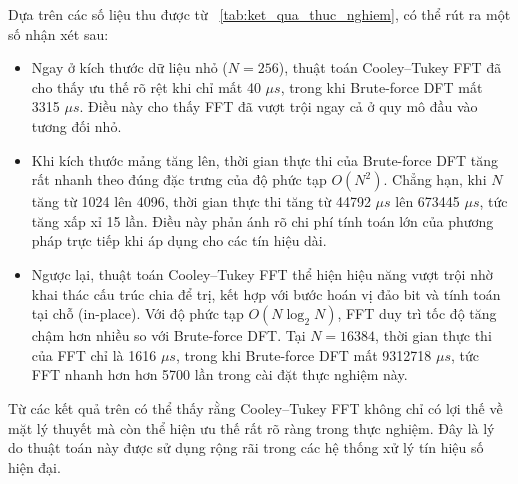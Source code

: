 Dựa trên các số liệu thu được từ \tablename~\ref{tab:ket_qua_thuc_nghiem}, có thể rút ra một số nhận xét sau:

\begin{itemize}
  \item Ngay ở kích thước dữ liệu nhỏ ($N = 256$), thuật toán Cooley--Tukey FFT đã cho thấy ưu thế rõ rệt khi chỉ mất 40 $\mu s$, trong khi Brute-force DFT mất 3315 $\mu s$. Điều này cho thấy FFT đã vượt trội ngay cả ở quy mô đầu vào tương đối nhỏ.

  \item Khi kích thước mảng tăng lên, thời gian thực thi của Brute-force DFT tăng rất nhanh theo đúng đặc trưng của độ phức tạp $O(N^2)$. Chẳng hạn, khi $N$ tăng từ 1024 lên 4096, thời gian thực thi tăng từ 44792 $\mu s$ lên 673445 $\mu s$, tức tăng xấp xỉ 15 lần. Điều này phản ánh rõ chi phí tính toán lớn của phương pháp trực tiếp khi áp dụng cho các tín hiệu dài.

  \item Ngược lại, thuật toán Cooley--Tukey FFT thể hiện hiệu năng vượt trội nhờ khai thác cấu trúc chia để trị, kết hợp với bước hoán vị đảo bit và tính toán tại chỗ (in-place). Với độ phức tạp $O(N \log_2 N)$, FFT duy trì tốc độ tăng chậm hơn nhiều so với Brute-force DFT. Tại $N = 16384$, thời gian thực thi của FFT chỉ là 1616 $\mu s$, trong khi Brute-force DFT mất 9312718 $\mu s$, tức FFT nhanh hơn hơn 5700 lần trong cài đặt thực nghiệm này.
\end{itemize}

Từ các kết quả trên có thể thấy rằng Cooley--Tukey FFT không chỉ có lợi thế về mặt lý thuyết mà còn thể hiện ưu thế rất rõ ràng trong thực nghiệm. Đây là lý do thuật toán này được sử dụng rộng rãi trong các hệ thống xử lý tín hiệu số hiện đại.